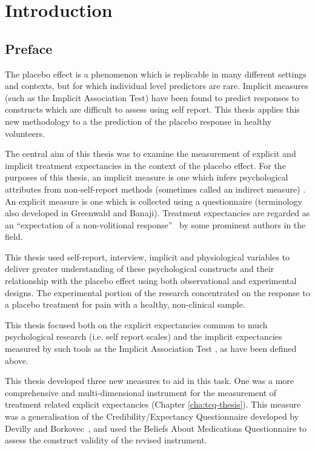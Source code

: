 
\chapter{Introduction}

\section{Preface}
\label{sec:preface}

The placebo effect is a phenomenon which is replicable in many different settings and contexts,  but for which individual level predictors are rare. Implicit measures (such as the Implicit Association Test) have been found to predict responses to constructs which are difficult to assess using self report. This thesis applies this new methodology to a the prediction of the placebo response in healthy volunteers. 


The central aim of this thesis was to examine the measurement of explicit and implicit treatment expectancies in the context of the placebo effect. 
For the purposes of this thesis, an implicit measure is one which infers psychological attributes from non-self-report methods (sometimes called an indirect measure) \cite{Greenwald1995a}. An explicit measure is one which is collected using a questionnaire (terminology also developed in Greenwald and Banaji). Treatment expectancies are regarded as an ``expectation of a non-volitional response''~\cite{Kirsch1985} by some prominent authors in the field. 

 
This thesis used self-report, interview, implicit and physiological variables to deliver greater understanding of these psychological constructs and their relationship with the placebo effect using both observational and experimental designs.  The experimental portion of the research concentrated on the response to a placebo treatment for pain with a healthy, non-clinical sample. 

This thesis focused both on the explicit expectancies common to much psychological research (i.e. self report scales) and the implicit expectancies measured by such tools as the Implicit Association Test \cite{Greenwald1998}, as have been defined above. 

This thesis developed three new measures to aid in this task. One was a more comprehensive and multi-dimensional instrument for the measurement of treatment related explicit expectancies (Chapter \ref{cha:tcq-thesis}). This measure was a generalisation of the Credibility/Expectancy Questionnaire developed by Devilly and Borkovec~\cite{Devilly2000}, and used the Beliefs About Medications Questionnaire \cite{Horne1999} to assess the construct validity of the revised instrument. 


